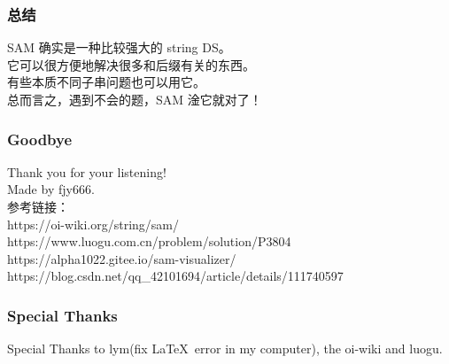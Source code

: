 \documentclass{beamer}
\begin{document}
    \begin{frame}
        \frametitle{总结}
        SAM 确实是一种比较强大的 string DS。  \\
        它可以很方便地解决很多和后缀有关的东西。\\
        有些本质不同子串问题也可以用它。\\
        总而言之，遇到不会的题，SAM 淦它就对了！
    \end{frame}

    \begin{frame}
        \frametitle{Goodbye}
        Thank you for your listening!\\
        Made by fjy666.\\
        参考链接：\\
        https://oi-wiki.org/string/sam/ \\
        https://www.luogu.com.cn/problem/solution/P3804 \\
        https://alpha1022.gitee.io/sam-visualizer/ \\
        https://blog.csdn.net/qq\_42101694/article/details/111740597
    \end{frame}

    \begin{frame}
        \frametitle{Special Thanks}
        Special Thanks to lym(fix \LaTeX\ error in my computer), the oi-wiki and luogu.
    \end{frame}
\end{document}
